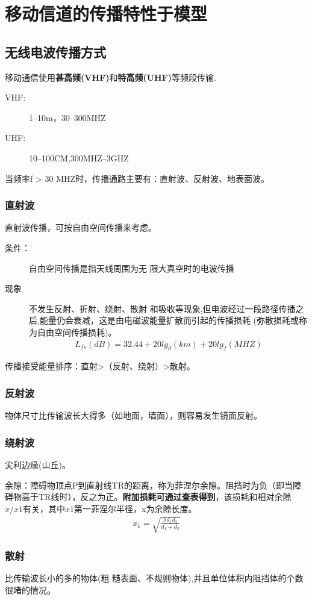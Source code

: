 \chapter{移动信道的传播特性于模型}
\section{无线电波传播方式
}
移动通信使用\textbf{甚高频(VHF)}和\textbf{特高频(UHF)}等频段传输.
\begin{description}
	\item[VHF:] 1--10m，30--300MHZ
	\item[UHF:] 10--100CM,300MHZ--3GHZ
\end{description}
当频率f > 30 MHZ时，传播通路主要有：直射波、反射波、地表面波。
\subsection{直射波}
直射波传播，可按自由空间传播来考虑。
\begin{description}
	\item[条件：] 自由空间传播是指天线周围为无
	限大真空时的电波传播
	\item[现象] 不发生反射、折射、绕射、散射
	和吸收等现象,但电波经过一段路径传播之
	后,能量仍会衰减，这是由电磁波能量扩散而引起的传播损耗
	(弥散损耗或称为自由空间传播损耗)。
	\begin{eqnarray}
	L_{fs}(dB) = 32.44 + 20lg_d(km)+20lg_f(MHZ)
	\end{eqnarray}
\end{description}
传播接受能量排序：直射>（反射、绕射）>散射。
\subsection{反射波}
物体尺寸比传输波长大得多（如地面，墙面），则容易发生镜面反射。
\subsection{绕射波}
尖利边缘(山丘)。

余隙：障碍物顶点P到直射线TR的距离，称为菲涅尔余隙。阻挡时为负（即当障碍物高于TR线时），反之为正。\textbf{附加损耗可通过查表得到}，该损耗和相对余隙$x/x1$有关，其中\(x1\)第一菲涅尔半径，x为余隙长度。
\begin{eqnarray}
x_1 = \sqrt{\frac{\lambda d_1d_2}{d_1+d_2}}
\end{eqnarray}
\subsection{散射}
比传输波长小的多的物体(粗
糙表面、不规则物体),并且单位体积内阻挡体的个数很堵的情况。
